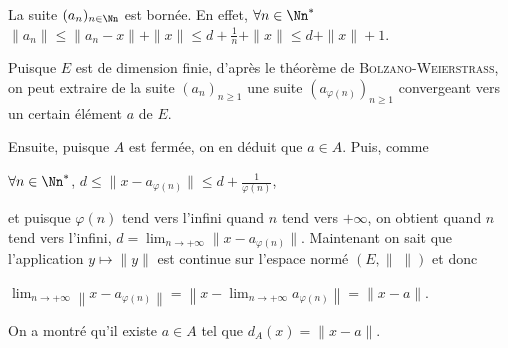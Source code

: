 {\begin{enumerate}
{La suite $(a_n)_{n\in\Nn}$ est bornée. En effet, $\forall n\in\Nn^*$ $\|a_n\|\leqslant \|a_n-x\|+\|x\|\leqslant d+ \frac{1}{n}+\| x\|\leqslant d+\|x\|+1$.

Puisque $E$ est de dimension finie, d'après le théorème de \textsc{Bolzano}-\textsc{Weierstrass},  on peut extraire de la suite $(a_n)_{n\geqslant1}$ une suite $(a_{\varphi(n)})_{n\geqslant1}$ convergeant vers un certain élément $a$ de $E$.

Ensuite, puisque $A$ est fermée, on en déduit que $a\in A$. Puis, comme

\begin{center}
$\forall n\in\Nn^*$, $d\leqslant\|x-a_{\varphi(n)}\| \leqslant d+ \frac{1}{\varphi(n)}$,
\end{center}

et puisque $\varphi(n)$ tend vers l'infini quand $n$ tend vers $+\infty$, on obtient quand $n$ tend vers l'infini, $d =\lim_{n \rightarrow +\infty}\|x-a_{\varphi(n)}\|$. Maintenant on sait que l'application $y\mapsto\|y\|$ est continue sur l'espace normé $(E,\|\;\|)$ et donc 

\begin{center}
$\lim_{n \rightarrow +\infty}\left\|x-a_{\varphi(n)}\right\|=\left\|x-\lim_{n \rightarrow +\infty}a_{\varphi(n)}\right\|=\|x-a\|$.
\end{center}

On a montré qu'il existe $a\in A$ tel que $d_A(x)=\|x-a\|$.}
\end{enumerate}
}
